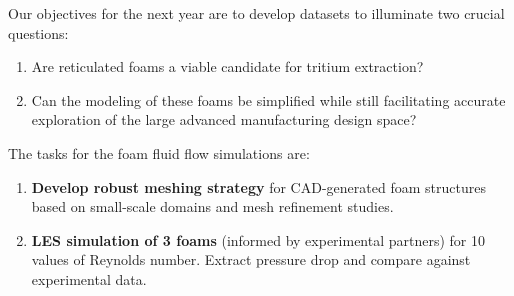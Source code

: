 Our objectives for the next year are to develop datasets to illuminate two crucial questions:
\begin{enumerate}
\item Are reticulated foams a viable candidate for tritium extraction?
\item Can the modeling of these foams be simplified while still facilitating accurate exploration of the large advanced manufacturing design space?
\end{enumerate}

The tasks for the foam fluid flow simulations are:

\vspace{-.15in}
\begin{enumerate}[label=\textbf{\Roman*}]
\item \textbf{Develop robust meshing strategy} for CAD-generated foam structures based on small-scale domains and mesh refinement studies.
\item \textbf{LES simulation of 3 foams} (informed by experimental partners) for 10 values of Reynolds number. Extract pressure drop and compare against experimental data.
\end{enumerate}
\vspace{-.15in}
